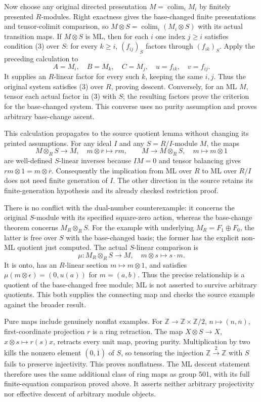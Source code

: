 Now choose any original directed presentation \(M=\operatorname{colim}_i M_i\) by finitely presented \(R\)-modules. Right exactness gives the base-changed finite presentations and tensor-colimit comparison, so \(M\otimes S=\operatorname{colim}_i(M_i\otimes S)\) with its actual transition maps. If \(M\otimes S\) is ML, then for each \(i\) one index \(j\geq i\) satisfies condition (3) over \(S\): for every \(k\geq i\), \((f_{ij})_S\) factors through \((f_{ik})_S\). Apply the preceding calculation to \[
A=M_i,\quad B=M_k,\quad C=M_j,\quad u=f_{ik},\quad v=f_{ij}.
\] It supplies an \(R\)-linear factor for every such \(k\), keeping the same \(i,j\). Thus the original system satisfies (3) over \(R\), proving descent. Conversely, for an ML \(M\), tensor each actual factor in (3) with \(S\); the resulting factors prove the criterion for the base-changed system. This converse uses no purity assumption and proves arbitrary base-change ascent.

This calculation propagates to the source quotient lemma without changing its printed assumptions. For any ideal \(I\) and any \(S=R/I\)-module \(M\), the maps \[
M\otimes_R S\longrightarrow M,\quad m\otimes\overline r\longmapsto rm,
\qquad M\longrightarrow M\otimes_R S,\quad m\longmapsto m\otimes1
\] are well-defined \(S\)-linear inverses because \(IM=0\) and tensor balancing gives \(rm\otimes1=m\otimes\overline r\). Consequently the implication from ML over \(R\) to ML over \(R/I\) does not need finite generation of \(I\). The other direction in the source retains its finite-generation hypothesis and its already checked restriction proof.

There is no conflict with the dual-number counterexample: it concerns the original \(S\)-module with its specified square-zero action, whereas the base-change theorem concerns \(M_R\otimes_R S\). For the example with underlying \(M_R=F_1\oplus F_0\), the latter is free over \(S\) with the base-changed basis; the former has the explicit non-ML quotient just computed. The actual \(S\)-linear comparison is \[
\mu:M_R\otimes_R S\longrightarrow M,\quad m\otimes s\longmapsto s\cdot m.
\] It is onto, has an \(R\)-linear section \(m\mapsto m\otimes1\), and satisfies \(\mu(m\otimes\epsilon)=(0,u(a))\) for \(m=(a,b)\). Thus the precise relationship is a quotient of the base-changed free module; ML is not asserted to survive arbitrary quotients. This both supplies the connecting map and checks the source example against the broader result.

Pure maps include genuinely nonflat examples. For \(\mathbb Z\to\mathbb Z\times\mathbb Z/2\), \(n\mapsto(n,\overline n)\), first-coordinate projection \(r\) is a ring retraction. The map \(X\otimes S\to X\), \(x\otimes s\mapsto r(s)x\), retracts every unit map, proving purity. Multiplication by two kills the nonzero element \((0,\overline1)\) of \(S\), so tensoring the injection \(\mathbb Z\xrightarrow{2}\mathbb Z\) with \(S\) fails to preserve injectivity. This proves nonflatness. The ML descent statement therefore uses the same additional class of ring maps as group 501, with its full finite-equation comparison proved above. It asserts neither arbitrary projectivity nor effective descent of arbitrary module objects.

